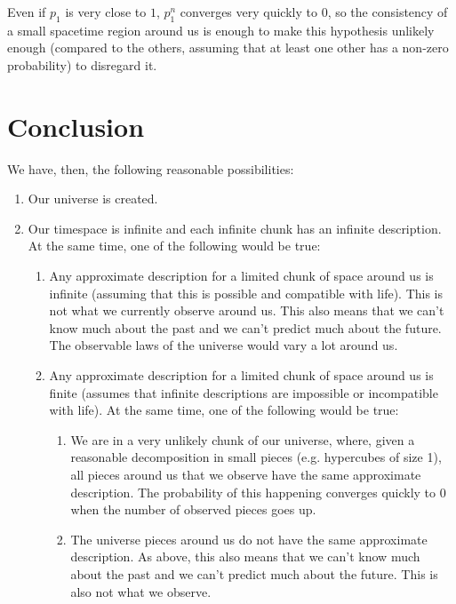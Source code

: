 \documentclass[a4paper
,draft
]{article}
\begin{document}
Even if $p_1$ is very close to $1$, $p_1^n$ converges very quickly to $0$,
so the consistency of a small spacetime region around us is enough
to make this hypothesis unlikely enough (compared to the others, assuming
that at least one other has a non-zero probability) to disregard it.

\section{Conclusion}

We have, then, the following reasonable possibilities:

\begin{enumerate}
\item Our universe is created.
\item Our timespace is infinite and each infinite chunk has an infinite
      description. At the same time, one of the following would be true:
      \begin{enumerate}
      \item Any approximate description for a limited chunk of space around us
            is infinite (assuming that this is possible and compatible with
            life). This is not what we currently observe around us.
            This also means that we can't know much about the past and we can't
            predict much about the future. The observable laws of the
            universe would vary a lot around us.
      \item Any approximate description for a limited chunk of space around us
            is finite (assumes that infinite descriptions are impossible or
            incompatible with life). At the same time, one of the following
            would be true:
            \begin{enumerate}
            \item We are in a very unlikely chunk of our universe, where,
                  given a reasonable decomposition in small pieces (e.g.
                  hypercubes of size 1), all pieces around us that we observe
                  have the same approximate description. The probability
                  of this happening converges quickly to $0$ when the number
                  of observed pieces goes up.
            \item The universe pieces around us do not have the same
                  approximate description. As above, this also means that
                  we can't know much about the past and we can't
                  predict much about the future. This is also not what we
                  observe.
            \end{enumerate}
      \end{enumerate}
\end{enumerate}
\end{document}
